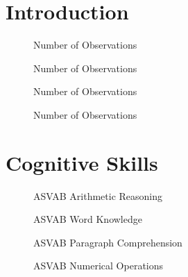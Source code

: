 \section{Introduction}
\begin{figure}[htp]\centering
\caption{Number of Observations}
\end{figure}

\begin{figure}[htp]\centering
\caption{Number of Observations}
\end{figure}

\begin{figure}[htp]\centering
\caption{Number of Observations}
\end{figure}

\begin{figure}[htp]\centering
\caption{Number of Observations}
\end{figure}

\section{Cognitive Skills}
\begin{figure}[htp]\centering
\caption{ASVAB Arithmetic Reasoning}
\end{figure}

\begin{figure}[htp]\centering
\caption{ASVAB Word Knowledge}
\end{figure}


\begin{figure}[htp]\centering
\caption{ASVAB Paragraph Comprehension}
\end{figure}


\begin{figure}[htp]\centering
\caption{ASVAB Numerical Operations}
\end{figure}


